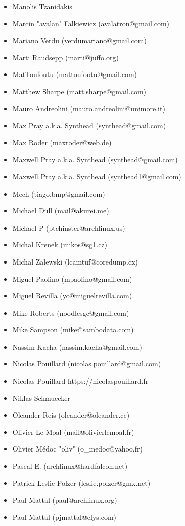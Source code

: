 \begin{itemize}
\item  Manolis Tzanidakis
\item  Marcin "avalan" Falkiewicz (avalatron@gmail.com)
\item  Mariano Verdu (verdumariano@gmail.com)
\item  Marti Raudsepp (marti@juffo.org)
\item  MatToufoutu (mattoufootu@gmail.com)
\item  Matthew Sharpe (matt.sharpe@gmail.com)
\item  Mauro Andreolini (mauro.andreolini@unimore.it)
\item  Max Pray a.k.a. Synthead (synthead@gmail.com)
\item  Max Roder (maxroder@web.de)
\item  Maxwell Pray a.k.a. Synthead (synthead@gmail.com)
\item  Maxwell Pray a.k.a. Synthead (synthead1@gmail.com)
\item  Mech (tiago.bmp@gmail.com)
\item  Michael Düll (mail@akurei.me)
\item  Michael P (ptchinster@archlinux.us)
\item  Michal Krenek (mikos@sg1.cz)
\item  Michal Zalewski (lcamtuf@coredump.cx)
\item  Miguel Paolino (mpaolino@gmail.com)
\item  Miguel Revilla (yo@miguelrevilla.com)
\item  Mike Roberts (noodlesgc@gmail.com)
\item  Mike Sampson (mike@sambodata.com)
\item  Nassim Kacha (nassim.kacha@gmail.com)
\item  Nicolas Pouillard (nicolas.pouillard@gmail.com)
\item  Nicolas Pouillard https://nicolaspouillard.fr
\item  Niklas Schmuecker
\item  Oleander Reis (oleander@oleander.cc)
\item  Olivier Le Moal (mail@olivierlemoal.fr)
\item  Olivier Médoc "oliv" (o\_medoc@yahoo.fr)
\item  Pascal E. (archlinux@hardfalcon.net)
\item  Patrick Leslie Polzer (leslie.polzer@gmx.net)
\item  Paul Mattal (paul@archlinux.org)
\item  Paul Mattal (pjmattal@elys.com)

\end{itemize}
